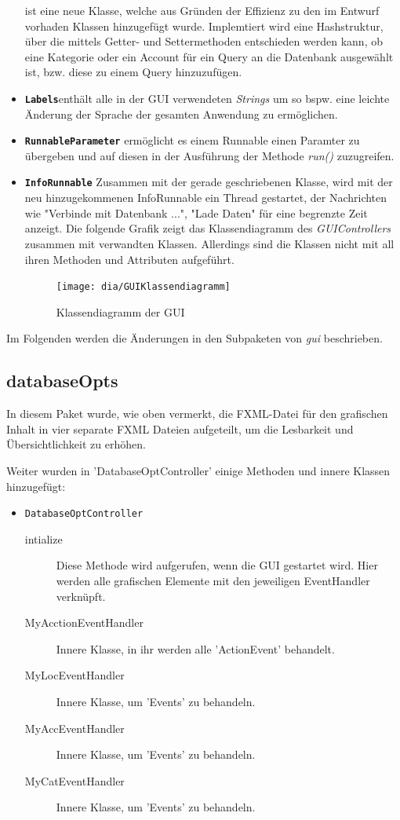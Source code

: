 \begin{itemize}
	ist eine neue Klasse, welche aus Gründen der Effizienz zu den im Entwurf vorhaden Klassen hinzugefügt wurde. Implemtiert wird eine Hashstruktur, über die mittels Getter- und Settermethoden entschieden werden kann, ob eine Kategorie oder ein Account für ein Query an die Datenbank ausgewählt ist, bzw. diese zu einem Query hinzuzufügen.
	\item \textbf{\lstinline{Labels}}\quad enthält alle in der GUI verwendeten \emph{Strings} um so bspw. eine leichte Änderung der Sprache der gesamten Anwendung zu ermöglichen.
	\item \textbf{\lstinline{RunnableParameter}} ermöglicht es einem Runnable einen Paramter zu übergeben und auf diesen in der Ausführung der Methode \emph{run()} zuzugreifen.
	\item \textbf{\lstinline{InfoRunnable}} \quad Zusammen mit der gerade geschriebenen Klasse, wird mit der neu hinzugekommenen InfoRunnable ein Thread gestartet, der Nachrichten wie "Verbinde mit Datenbank ...", "Lade Daten" für eine begrenzte Zeit anzeigt.	
	Die folgende Grafik zeigt das Klassendiagramm des \emph{GUIControllers} zusammen mit verwandten Klassen. Allerdings sind die Klassen nicht mit all ihren Methoden und Attributen aufgeführt.
	\begin{figure}[H]
		\centering
		\texttt{[image: dia/GUIKlassendiagramm]}
		\caption{Klassendiagramm der GUI}
		\label{fig:GUI}
	\end{figure}
\end{itemize}

Im Folgenden werden die Änderungen in den Subpaketen von \emph{gui} beschrieben.

\subsection{databaseOpts}
In diesem Paket wurde, wie oben vermerkt, die FXML-Datei für den grafischen Inhalt in vier separate FXML Dateien aufgeteilt, um die Lesbarkeit und Übersichtlichkeit zu erhöhen.


Weiter wurden in 'DatabaseOptController' einige Methoden und innere Klassen hinzugefügt:
\begin{itemize}
	\item \lstinline{DatabaseOptController}
	\quad
	\begin{description}
		\item[intialize]
		\quad
		Diese Methode wird aufgerufen, wenn die GUI gestartet wird. Hier werden alle grafischen Elemente mit den jeweiligen EventHandler verknüpft.
	
			\item[MyAcctionEventHandler] Innere Klasse, in ihr werden alle 'ActionEvent' behandelt. 
			\item[MyLocEventHandler] Innere Klasse, um 'Events' zu behandeln.
			\item[MyAccEventHandler] Innere Klasse, um 'Events' zu behandeln.
			\item[MyCatEventHandler] Innere Klasse, um 'Events' zu behandeln.
		\end{description}
\end{itemize}
	
